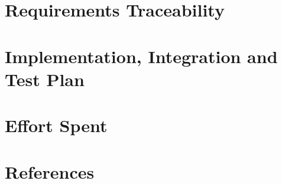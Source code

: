 \documentclass{Configuration_Files/PoliMi3i_thesis}
\newcommand{\folder}{Chapters/}	%
\begin{document}
\chapter{Requirements Traceability}


\chapter{Implementation, Integration and Test Plan}


\chapter{Effort Spent}


\chapter{References}


\listoffigures

\listoftables

\cleardoublepage
\end{document}
